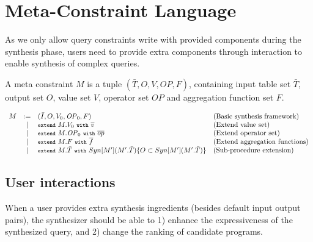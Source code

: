 \documentclass[letter, notitlepage]{article}
\newcommand{\code}[1]{\texttt{\footnotesize #1}}
\begin{document}
\section{Meta-Constraint Language}
As we only allow query constraints write with provided components during the synthesis phase, users need to provide extra components through interaction to enable synthesis of complex queries.

A meta constraint $M$ is a tuple $(\bar{T},O, V, \mathit{OP}, F)$, containing input table set $\bar{T}$, output set $O$, value set $V$, operator set $\mathit{OP}$ and aggregation function set $F$.

\[
\begin{array}{rcll}
	M & := & (\bar{I}, O, V_0, \mathit{OP}_0, F) & \text{(Basic synthesis framework)}\\
		& |  & \code{extend}~M.V_0~\code{with}~\overline{v} & \text{(Extend value set)}\\
		& |  & \code{extend}~M.\mathit{OP}_0~\code{with}~\overline{op} & \text{(Extend operator set)}\\
		& |  & \code{extend}~M.F~\code{with}~\overline{f} & \text{(Extend aggregation functions)}\\
		& |  & \code{extend}~M.\bar{T}~\code{with}~Syn[M'](M'.\bar{T})\{O\subset Syn[M'](M'.\bar{T})\} & \text{(Sub-procedure extension)}
\end{array}
\]

\subsection{User interactions}
When a user provides extra synthesis ingredients (besides default input output pairs), the synthesizer should be able to 1) enhance the expressiveness of the synthesized query, and 2) change the ranking of candidate programs.
\end{document}
